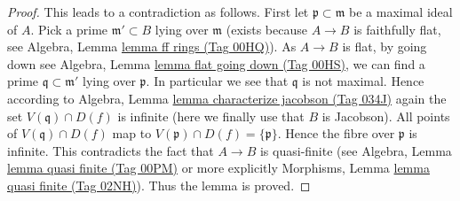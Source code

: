 \documentclass{amsart}
\theoremstyle{plain}
\theoremstyle{definition}
\theoremstyle{remark}
\numberwithin{equation}{subsection}
\begin{document}
\begin{proof}
\medskip\noindent
This leads to a contradiction as follows. First let
$\mathfrak p \subset \mathfrak m$ be a maximal ideal of $A$.
Pick a prime $\mathfrak m' \subset B$ lying over $\mathfrak m$
(exists because $A \to B$ is faithfully flat, see
Algebra, Lemma \href{https://stacks.math.columbia.edu/tag/00HQ}{lemma ff rings (Tag 00HQ)}).
As $A \to B$ is flat, by going down see
Algebra, Lemma \href{https://stacks.math.columbia.edu/tag/00HS}{lemma flat going down (Tag 00HS)},
we can find a prime $\mathfrak q \subset \mathfrak m'$ lying over
$\mathfrak p$. In particular we see that $\mathfrak q$ is not
maximal. Hence according to
Algebra, Lemma \href{https://stacks.math.columbia.edu/tag/034J}{lemma characterize jacobson (Tag 034J)} again
the set $V(\mathfrak q) \cap D(f)$ is infinite
(here we finally use that $B$ is Jacobson).
All points of $V(\mathfrak q) \cap D(f)$ map to
$V(\mathfrak p) \cap D(f) = \{\mathfrak p\}$. Hence the
fibre over $\mathfrak p$ is infinite. This contradicts the
fact that $A \to B$ is quasi-finite (see
Algebra, Lemma \href{https://stacks.math.columbia.edu/tag/00PM}{lemma quasi finite (Tag 00PM)}
or more explicitly
Morphisms, Lemma \href{https://stacks.math.columbia.edu/tag/02NH}{lemma quasi finite (Tag 02NH)}).
Thus the lemma is proved.
\end{proof}
\end{document}
